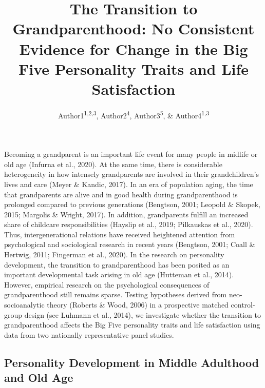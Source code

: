 \documentclass[
  english,
  man, noextraspace,floatsintext]{apa7}
\title{The Transition to Grandparenthood: No Consistent Evidence for Change in the Big Five Personality Traits and Life Satisfaction}
\author{Author1\textsuperscript{1,2,3}, Author2\textsuperscript{4}, Author3\textsuperscript{5}, \& Author4\textsuperscript{1,3}}
\date{}
\affiliation{\vspace{0.5cm}\textsuperscript{1} Institution1\\\textsuperscript{2} Institution2\\\textsuperscript{3} Institution3\\\textsuperscript{4} Institution4\\\textsuperscript{5} Institution5}
\begin{document}
\maketitle

Becoming a grandparent is an important life event for many people in midlife or old age (Infurna et al., 2020). At the same time, there is considerable heterogeneity in how intensely grandparents are involved in their grandchildren's lives and care (Meyer \& Kandic, 2017). In an era of population aging, the time that grandparents are alive and in good health during grandparenthood is prolonged compared to previous generations (Bengtson, 2001; Leopold \& Skopek, 2015; Margolis \& Wright, 2017). In addition, grandparents fulfill an increased share of childcare responsibilities (Hayslip et al., 2019; Pilkauskas et al., 2020). Thus, intergenerational relations have received heightened attention from psychological and sociological research in recent years (Bengtson, 2001; Coall \& Hertwig, 2011; Fingerman et al., 2020). In the research on personality development, the transition to grandparenthood has been posited as an important developmental task arising in old age (Hutteman et al., 2014). However, empirical research on the psychological consequences of grandparenthood still remains sparse. Testing hypotheses derived from neo-socioanalytic theory (Roberts \& Wood, 2006) in a prospective matched control-group design (see Luhmann et al., 2014), we investigate whether the transition to grandparenthood affects the Big Five personality traits and life satisfaction using data from two nationally representative panel studies.

\hypertarget{personality-development-in-middle-adulthood-and-old-age}{%
\subsection{Personality Development in Middle Adulthood and Old Age}\label{personality-development-in-middle-adulthood-and-old-age}}
\end{document}
